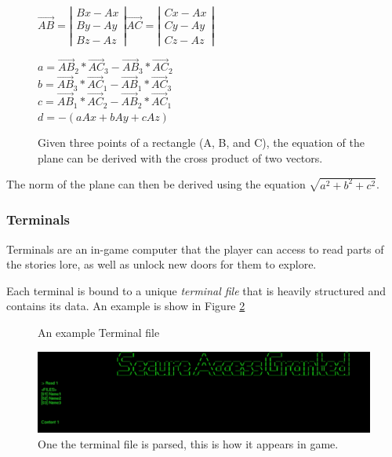 \documentclass{article}
\begin{document}
\begin{figure}[H]
\centering
\noindent
$
\vec{AB} = \left| \begin{array}{c}
Bx - Ax \\
By - Ay \\
Bz - Az
\end{array} \right|
\vec{AC} = \left| \begin{array}{c}
Cx - Ax \\
Cy - Ay \\
Cz - Az
\end{array} \right|$ 
\vspace{.5cm}

$a = \vec{AB}_2 * \vec{AC}_3 - \vec{AB}_3 * \vec{AC}_2$ \\
$b = \vec{AB}_3 * \vec{AC}_1 - \vec{AB}_1 * \vec{AC}_3$ \\
$c = \vec{AB}_1 * \vec{AC}_2 - \vec{AB}_2 * \vec{AC}_1$ \\
$d = -(aAx + bAy + cAz)$

\caption{Given three points of a rectangle (A, B, and C), the equation of the plane can be derived with the cross product of two vectors. \cite{Plane} }
\label{fig:rectangles}
\end{figure}
The norm of the plane can then be derived using the equation $\sqrt{a^2 + b^2 + c^2}$.

\subsubsection{Terminals} \label{subsubsec:terminals}

Terminals are an in-game computer that the player can access to read parts of the stories lore, as well as unlock new doors for them to explore.

Each terminal is bound to a unique \emph{terminal file} that is heavily structured and contains its data. An example is show in Figure \ref{fig:terminal}

\begin{figure}[H]
	\centering
	
	\caption{An example Terminal file}
	\label{fig:terminal}
\end{figure}

\begin{figure}[H]
	\centering
	\includegraphics[width=500px]{screen}
	\caption{One the terminal file is parsed, this is how it appears in game.}
	\label{fig:terminalscreen}
\end{figure}
\end{document}
